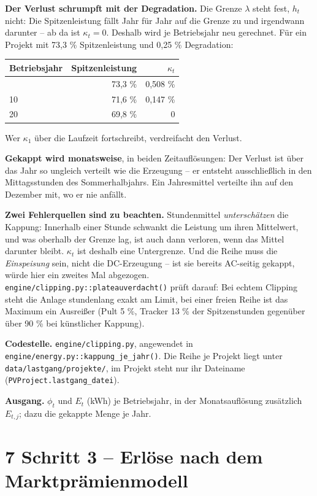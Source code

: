 \documentclass[
  a4paper,
  10pt]{article}
\begin{document}
\textbf{Der Verlust schrumpft mit der Degradation.} Die Grenze
\(\lambda\) steht fest, \(h_t\) nicht: Die Spitzenleistung fällt Jahr
für Jahr auf die Grenze zu und irgendwann darunter -- ab da ist
\(\kappa_t = 0\). Deshalb wird je Betriebsjahr neu gerechnet. Für ein
Projekt mit 73,3 \% Spitzenleistung und 0,25 \% Degradation:

\begin{longtable}[]{@{}lrr@{}}
\toprule\noalign{}
Betriebsjahr & Spitzenleistung & \(\kappa_t\) \\
\midrule\noalign{}
\endhead
\bottomrule\noalign{}
\endlastfoot
1 & 73,3 \% & 0,508 \% \\
10 & 71,6 \% & 0,147 \% \\
20 & 69,8 \% & 0 \\
\end{longtable}

Wer \(\kappa_1\) über die Laufzeit fortschreibt, verdreifacht den
Verlust.

\textbf{Gekappt wird monatsweise}, in beiden Zeitauflösungen: Der
Verlust ist über das Jahr so ungleich verteilt wie die Erzeugung -- er
entsteht ausschließlich in den Mittagsstunden des Sommerhalbjahrs. Ein
Jahresmittel verteilte ihn auf den Dezember mit, wo er nie anfällt.

\textbf{Zwei Fehlerquellen sind zu beachten.} Stundenmittel
\emph{unterschätzen} die Kappung: Innerhalb einer Stunde schwankt die
Leistung um ihren Mittelwert, und was oberhalb der Grenze lag, ist auch
dann verloren, wenn das Mittel darunter bleibt. \(\kappa_t\) ist deshalb
eine Untergrenze. Und die Reihe muss die \emph{Einspeisung} sein, nicht
die DC-Erzeugung -- ist sie bereits AC-seitig gekappt, würde hier ein
zweites Mal abgezogen. \nolinkurl{engine/clipping.py::plateauverdacht()}
prüft darauf: Bei echtem Clipping steht die Anlage stundenlang exakt am
Limit, bei einer freien Reihe ist das Maximum ein Ausreißer (Pult 5 \%,
Tracker 13 \% der Spitzenstunden gegenüber über 90 \% bei künstlicher
Kappung).

\textbf{Codestelle.} \nolinkurl{engine/clipping.py}, angewendet in
\nolinkurl{engine/energy.py::kappung_je_jahr()}. Die Reihe je Projekt
liegt unter \nolinkurl{data/lastgang/projekte/}, im Projekt steht nur ihr
Dateiname (\texttt{PVProject.lastgang\_datei}).

\textbf{Ausgang.} \(\phi_t\) und \(E_t\) (kWh) je Betriebsjahr, in der
Monatsauflösung zusätzlich \(E_{t,j}\); dazu die gekappte Menge je Jahr.

\hypertarget{schritt-3-erluxf6se-nach-dem-marktpruxe4mienmodell}{%
\section{7 Schritt 3 -- Erlöse nach dem
Marktprämienmodell}\label{schritt-3-erluxf6se-nach-dem-marktpruxe4mienmodell}}
\end{document}
